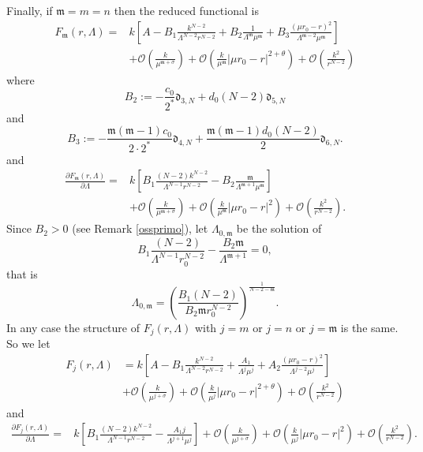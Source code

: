 \documentclass[11pt,a4paper]{amsart}
\begin{document}
Finally, if $\mathfrak m=m=n$ then the reduced functional is
$$\begin{aligned} F_{\mathfrak m}(r, \Lambda)=&k\left[A-B_1\frac{k^{N-2}}{\Lambda^{N-2}r^{N-2}}+B_2\frac{1}{\Lambda^{\mathfrak m} \mu^{\mathfrak m}}+ B_3\frac{(\mu r_0-r)^2}{\Lambda^{\mathfrak m-2}\mu^{\mathfrak m}}\right]\\
&+\mathcal O\left(\frac{k}{\mu^{\mathfrak m+\sigma}}\right)  +\mathcal O\left(\frac{k}{\mu^{\mathfrak m}}|\mu r_0-r|^{2+\theta}\right)+\mathcal O\left(\frac{k^2}{r^{N-2}}\right)
\end{aligned}$$
where 
\begin{equation}\label{B2}
B_2:=-\frac{c_0}{2^*}\mathfrak d_{3, N}+d_0(N-2)\mathfrak d_{5, N}
\end{equation}
and
\begin{equation}\label{B3}
B_3:=-\frac{\mathfrak m(\mathfrak m-1)c_0}{2\cdot 2^*}\mathfrak d_{4, N}+\frac{\mathfrak m(\mathfrak m-1)d_0(N-2)}{2}\mathfrak d_{6, N}.
\end{equation}
and
$$\begin{aligned} \frac{\partial F_{\mathfrak m}(r, \Lambda)}{\partial\Lambda}=&k\left[B_1\frac{(N-2)k^{N-2}}{\Lambda^{N-1}r^{N-2}}-B_2\frac{\mathfrak m}{\Lambda^{\mathfrak m+1} \mu^{\mathfrak m}}\right]\\
&+\mathcal O\left(\frac{k}{\mu^{\mathfrak m+\sigma}}\right)  +\mathcal O\left(\frac{k}{\mu^{\mathfrak m}}|\mu r_0-r|^{2}\right)+\mathcal O\left(\frac{k^2}{r^{N-2}}\right).
\end{aligned}$$
Since $B_2>0$ (see Remark \ref{ossprimo}), let $\Lambda_{0, \mathfrak m}$ be the solution of
\[
B_1\frac{(N-2)}{\Lambda^{N-1}r^{N-2}_0}-\frac{B_2\mathfrak m}{\Lambda^{\mathfrak m+1} }=0,
\]
that is
\[
\Lambda_{0, \mathfrak m}=\left(\frac{B_1(N-2)}{B_2 \mathfrak m r_{0}^{N-2}}\right)^{\frac{1}{N-2-\mathfrak m}}.
\]
In any case the structure of $F_j(r, \Lambda)$ with $j=m$ or $j=n$ or $j=\mathfrak m$ is the same. So we let
$$\begin{aligned} F_{j}(r, \Lambda)&=k\left[A-B_1\frac{k^{N-2}}{\Lambda^{N-2}r^{N-2}}+\frac{A_1}{\Lambda^{j} \mu^{j}}+ A_2\frac{(\mu r_0-r)^2}{\Lambda^{j-2}\mu^{j}}\right]\\
&+\mathcal O\left(\frac{k}{\mu^{j+\sigma}}\right)  +\mathcal O\left(\frac{k}{\mu^{j}}|\mu r_0-r|^{2+\theta}\right)+\mathcal O\left(\frac{k^2}{r^{N-2}}\right)
\end{aligned}$$ and
$$\begin{aligned} \frac{\partial F_j(r, \Lambda)}{\partial\Lambda}=&k\left[B_1\frac{(N-2)k^{N-2}}{\Lambda^{N-1}r^{N-2}}-\frac{A_1 j }{\Lambda^{j+1} \mu^j}\right]+\mathcal O\left(\frac{k}{\mu^{j+\sigma}}\right)  +\mathcal O\left(\frac{k}{\mu^{j}}|\mu r_0-r|^{2}\right)+\mathcal O\left(\frac{k^2}{r^{N-2}}\right).
\end{aligned}$$
\end{document}
